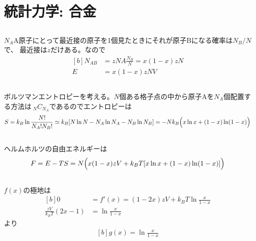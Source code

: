 \documentclass[../ap_2022.tex]{subfiles}
\begin{document}
\setcounter{chapter}{2}
\chapter{統計力学: 合金}
\section{}
\(N_A\)A原子にとって最近接の原子を1個見たときにそれが原子Bになる確率は\(N_B/N\)で、
最近接は\(z\)だけある。なので
\begin{equation}\begin{aligned}[b]
    N_{AB}&=zNA\frac{N_B}{N}=x(1-x)zN\\
    E &= x(1-x)zNV
\end{aligned}\end{equation}

\section{}
ボルツマンエントロピーを考える。\(N\)個ある格子点の中から原子Aを\(N_A\)個配置する方法は\(~_NC_{N_A}\)であるのでエントロピーは
\begin{equation}\begin{aligned}[b]
    S = k_B \ln\frac{N!}{N_A!N_B!} \simeq k_B\qty[N\ln N-N_A\ln N_A -N_B\ln N_B]
    =-Nk_B\Bigl(x\ln x+(1-x)\ln(1-x)\Bigr)
\end{aligned}\end{equation}

\section{}
ヘルムホルツの自由エネルギーは
\begin{equation}\begin{aligned}[b]
    F = E-TS = N\Bigl(
        x(1-x)zV+k_BT\qty[x\ln x+(1-x)\ln(1-x)]
    \Bigr)
\end{aligned}\end{equation}

\section{}
\(f(x)\)の極地は
\begin{equation}\begin{aligned}[b]
    0 &= f'(x) = (1-2x)zV +k_BT\ln\frac{x}{1-x}\\
    \frac{zV}{k_BT}(2x-1) &= \ln\frac{x}{1-x}
\end{aligned}\end{equation}
より
\begin{equation}\begin{aligned}[b]
    g(x) = \ln\frac{x}{1-x}
\end{aligned}\end{equation}
\end{document}
